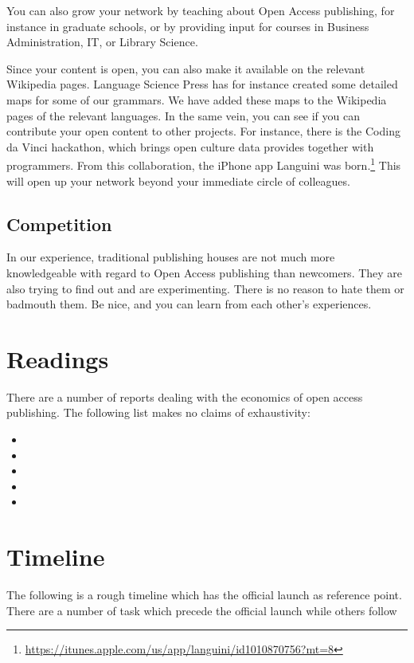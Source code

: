 \documentclass[nonflat,modfonts,output=book] {langsci/langscibook}
\newcommand{\footurl}[1]{\footnote{\url{#1}}}
\begin{document}
You can also grow your network by teaching about Open Access publishing, for instance in graduate schools, or by providing input for courses in Business Administration, IT, or Library Science. 

Since your content is open, you can also make it available on the relevant Wikipedia pages. Language Science Press has for instance created some detailed maps for some of our grammars. We have added these maps to the Wikipedia pages of the relevant languages. In the same vein, you can see if you can contribute your open content to other projects. For instance, there is the Coding da Vinci hackathon, which brings open culture data provides together with programmers. From this collaboration, the iPhone app Languini was born.\footurl{https://itunes.apple.com/us/app/languini/id1010870756?mt=8} This will open up your network beyond your immediate circle of colleagues.  

\section{Competition}\label{sec:competition}
In our experience, traditional publishing houses are not much more knowledgeable with regard to Open Access publishing than newcomers. They are also trying to find out and are experimenting. There is no reason to hate them or badmouth them. Be nice, and you can learn from each other's experiences. 

\chapter{Readings} 
There are a number of reports dealing with the economics of open access publishing. The following list makes no claims of exhaustivity:

\sloppy
\begin{itemize}
\item {}
\item {} 
\item {}
\item {}
\item {}
\end{itemize}
\fussy




\chapter{Timeline}
The following is a rough timeline which has the official launch as reference point. There are a number of task which precede the official launch while others follow
\end{document}
